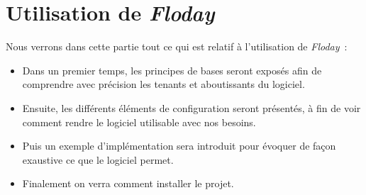 \section{Utilisation de \emph{Floday}}

\begin{intro}
	Nous verrons dans cette partie tout ce qui est relatif à l'utilisation de \emph{Floday}~:
	\begin{itemize}
		\item Dans un premier temps, les principes de bases seront exposés afin de comprendre avec précision les tenants et aboutissants du logiciel.
		\item Ensuite, les différents éléments de configuration seront présentés, à fin de voir comment rendre le logiciel utilisable avec nos besoins.
		\item Puis un exemple d'implémentation sera introduit pour évoquer de façon exaustive ce que le logiciel permet.
		\item Finalement on verra comment installer le projet.
	\end{itemize}
\end{intro}







